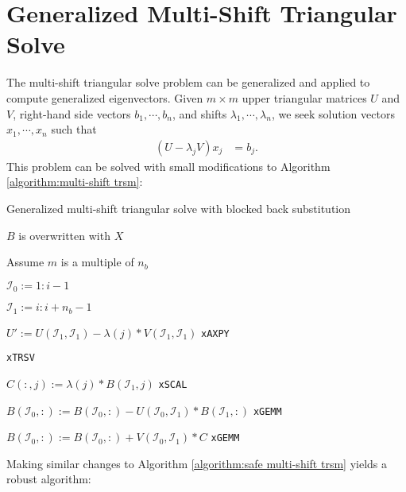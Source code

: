 \documentclass{article}
\begin{document}
\section{Generalized Multi-Shift Triangular Solve}
The multi-shift triangular solve problem can be generalized and
applied to compute generalized eigenvectors. Given \(m\times m\) upper
triangular matrices \(U\) and \(V\), right-hand side vectors
\(b_1,\cdots,b_n\), and shifts \(\lambda_1,\cdots,\lambda_n\), we seek
solution vectors \(x_1,\cdots,x_n\) such that
\begin{align}
  \left( U - \lambda_j V \right) x_j &= b_j .
\end{align}
This problem can be solved with small modifications to Algorithm
\ref{algorithm:multi-shift trsm}:
\begin{algorithm}[H]
  \caption{Generalized multi-shift triangular solve with blocked back substitution}
  \label{algorithm:generalized multi-shift trsm}
  \begin{algorithmic}
    \Comment \parbox[t]{0.22\linewidth}{\(B\) is overwritten with \(X\)}

     \Comment Assume \(m\) is a multiple of
    \(n_b\)

    \State \( \mathcal{I}_0 := 1:i-1 \)

    \State \( \mathcal{I}_1 := i:i+n_b-1\)
    

    \State \(U' := U(\mathcal{I}_1,\mathcal{I}_1)-\lambda(j) * V(\mathcal{I}_1,\mathcal{I}_1)\) \Comment \texttt{xAXPY}

    \State {} 
    \Comment \texttt{xTRSV}

    \State \( C(:,j) := \lambda(j) * B(\mathcal{I}_1,j)\) \Comment \texttt{xSCAL}

    \EndFor

    \State \( B(\mathcal{I}_0,:) := B(\mathcal{I}_0,:) - U(\mathcal{I}_0,\mathcal{I}_1) * B(\mathcal{I}_1,:) \)
    \Comment \texttt{xGEMM}

    \State \( B(\mathcal{I}_0,:) := B(\mathcal{I}_0,:) + V(\mathcal{I}_0,\mathcal{I}_1)* C \) \Comment \texttt{xGEMM}

    \EndFor

    \EndProcedure
  \end{algorithmic}
\end{algorithm}
\noindent
Making similar changes to Algorithm \ref{algorithm:safe multi-shift
  trsm} yields a robust algorithm:
\end{document}
